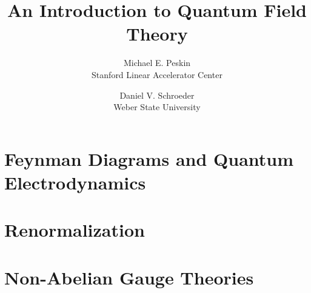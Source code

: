 \documentclass[11pt,oneside]{book}
\title{\bfseries An Introduction to Quantum Field Theory}
\author{Michael E. Peskin\\ Stanford Linear Accelerator Center
        \and Daniel V. Schroeder\\ Weber State University}
\date{}
\numberwithin{equation}{chapter}
\begin{document}
\frontmatter
\maketitle

\tableofcontents



\mainmatter

\part{Feynman Diagrams and Quantum Electrodynamics}








\part{Renormalization}







\part{Non-Abelian Gauge Theories}










\appendix

\end{document}
